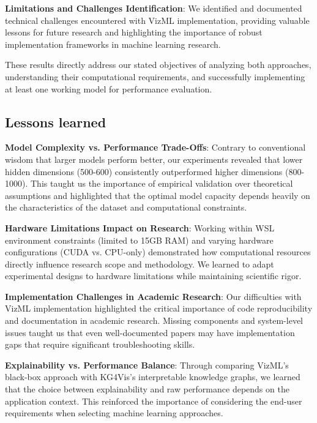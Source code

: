 \vspace{1em}
\noindent \textbf{Limitations and Challenges Identification}: We identified and documented technical challenges encountered with VizML implementation, providing valuable lessons for future research and highlighting the importance of robust implementation frameworks in machine learning research.

\vspace{1em}
\noindent These results directly address our stated objectives of analyzing both approaches, understanding their computational requirements, and successfully implementing at least one working model for performance evaluation.

\subsection{Lessons learned} 	

\vspace{1em}
\noindent \textbf{Model Complexity vs. Performance Trade-Offs}: Contrary to conventional wisdom that larger models perform better, our experiments revealed that lower hidden dimensions (500-600) consistently outperformed higher dimensions (800-1000). This taught us the importance of empirical validation over theoretical assumptions and highlighted that the optimal model capacity depends heavily on the characteristics of the dataset and computational constraints.

\vspace{1em}
\noindent \textbf{Hardware Limitations Impact on Research}: Working within WSL environment constraints (limited to 15GB RAM) and varying hardware configurations (CUDA vs. CPU-only) demonstrated how computational resources directly influence research scope and methodology. We learned to adapt experimental designs to hardware limitations while maintaining scientific rigor.

\vspace{1em}
\noindent \textbf{Implementation Challenges in Academic Research}: Our difficulties with VizML implementation highlighted the critical importance of code reproducibility and documentation in academic research. Missing components and system-level issues taught us that even well-documented papers may have implementation gaps that require significant troubleshooting skills.

\vspace{1em}
\noindent \textbf{Explainability vs. Performance Balance}: Through comparing VizML's black-box approach with KG4Vis's interpretable knowledge graphs, we learned that the choice between explainability and raw performance depends on the application context. This reinforced the importance of considering the end-user requirements when selecting machine learning approaches.

